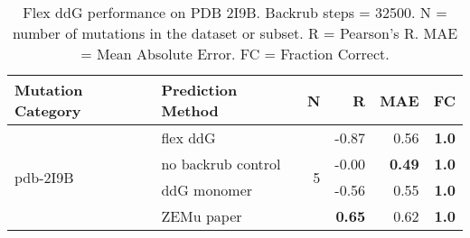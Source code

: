 \begin{table}
  \begin{tabular}{llrrrr}
\toprule
Mutation Category &   Prediction Method &  N &     R &  MAE &  FC \\
\midrule
 \multirow{ 4}{*}{pdb-2I9B} & flex ddG & \multirow{ 4}{*}{5} & -0.87 & 0.56 & \textbf{1.0}  \\
 & no backrub control & & -0.00 & \textbf{0.49} & \textbf{1.0}  \\
 & ddG monomer & & -0.56 & 0.55 & \textbf{1.0}  \\
 & ZEMu paper & & \textbf{0.65} & 0.62 & \textbf{1.0}  \\
\bottomrule
\end{tabular}
  \caption[Flex ddG performance on PDB 2I9B]{
    Flex ddG performance on PDB 2I9B. Backrub steps = 32500. N = number of mutations in the dataset or subset. R = Pearson's R. MAE = Mean Absolute Error. FC = Fraction Correct.
  } \label{tab:table-pdb-2I9B}
\end{table}
